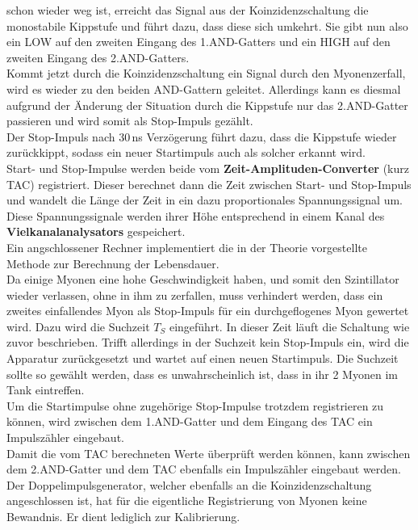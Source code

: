     schon wieder weg ist, erreicht das Signal aus der Koinzidenzschaltung
    die monostabile Kippstufe und führt dazu, dass diese sich umkehrt.
    Sie gibt nun also ein LOW auf den zweiten Eingang des 1.AND-Gatters und ein
    HIGH auf den zweiten Eingang des 2.AND-Gatters. \\
    Kommt jetzt durch die Koinzidenzschaltung ein Signal durch den Myonenzerfall,
    wird es wieder zu den beiden AND-Gattern geleitet. Allerdings kann es
    diesmal aufgrund der Änderung der Situation durch die Kippstufe
    nur das 2.AND-Gatter passieren und wird somit als Stop-Impuls gezählt.\\
    Der Stop-Impuls nach 30\,ns Verzögerung führt dazu, dass
    die Kippstufe wieder zurückkippt, sodass ein neuer Startimpuls auch
    als solcher erkannt wird.\\
    Start- und Stop-Impulse werden beide vom \textbf{Zeit-Amplituden-Converter}
    (kurz TAC) registriert. Dieser berechnet dann die Zeit zwischen Start-
    und Stop-Impuls und wandelt die Länge der Zeit in ein dazu proportionales
    Spannungssignal um. \\
    Diese Spannungssignale werden ihrer Höhe entsprechend in einem Kanal
    des \textbf{Vielkanalanalysators} gespeichert.\\
    Ein angschlossener Rechner implementiert die in der Theorie
    vorgestellte Methode zur Berechnung der Lebensdauer.\\
    Da einige Myonen eine hohe Geschwindigkeit haben, und somit den
    Szintillator wieder verlassen, ohne in ihm zu zerfallen, muss verhindert
    werden, dass ein zweites einfallendes Myon als Stop-Impuls für
    ein durchgeflogenes Myon gewertet wird. Dazu wird die Suchzeit $T_S$
    eingeführt. In dieser Zeit läuft die Schaltung wie zuvor beschrieben. Trifft
    allerdings in der Suchzeit kein Stop-Impuls ein, wird die Apparatur
    zurückgesetzt und wartet auf einen neuen Startimpuls.
    Die Suchzeit sollte so gewählt werden, dass es unwahrscheinlich ist,
    dass in ihr 2 Myonen im Tank eintreffen.\\
    Um die Startimpulse ohne zugehörige Stop-Impulse trotzdem registrieren zu
    können, wird zwischen dem 1.AND-Gatter und dem Eingang des
    TAC ein Impulszähler eingebaut.\\
    Damit die vom TAC berechneten Werte überprüft werden können,
    kann zwischen dem 2.AND-Gatter und dem TAC ebenfalls ein Impulszähler
    eingebaut werden.\\
    Der Doppelimpulsgenerator, welcher ebenfalls an die Koinzidenzschaltung
    angeschlossen ist, hat für die eigentliche Registrierung von Myonen
    keine Bewandnis. Er dient lediglich zur Kalibrierung.

